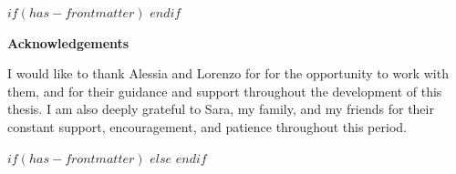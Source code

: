$if(has-frontmatter)$
\frontmatter
$endif$

\newcommand{\beamblankprelimpage}{%
  \clearpage
  \thispagestyle{empty}%
  \null
  \newpage
}

\beamblankprelimpage
\beamblankprelimpage
\clearpage
\thispagestyle{empty}%
\begin{center}
  {\Large \textbf{Acknowledgements}}
\end{center}

\noindent I would like to thank Alessia and Lorenzo for
for the opportunity to work with them, and for their guidance and support throughout the development of this thesis. I am also deeply grateful to
Sara, my family, and my friends for their constant support,
encouragement, and patience throughout this period.

\newpage
\beamblankprelimpage

$if(has-frontmatter)$
\mainmatter
$else$
\clearpage
{}
$endif$
\setcounter{page}{1}

